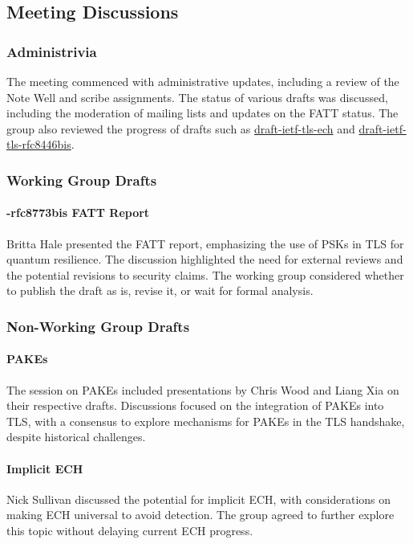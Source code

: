 \documentclass{article}
\begin{document}
\subsection{Meeting Discussions}

\subsubsection{Administrivia}
The meeting commenced with administrative updates, including a review of the Note Well and scribe assignments. The status of various drafts was discussed, including the moderation of mailing lists and updates on the FATT status. The group also reviewed the progress of drafts such as \href{https://datatracker.ietf.org/doc/html/draft-ietf-tls-ech}{draft-ietf-tls-ech} and \href{https://datatracker.ietf.org/doc/html/draft-ietf-tls-rfc8446bis}{draft-ietf-tls-rfc8446bis}.

\subsubsection{Working Group Drafts}
\paragraph{-rfc8773bis FATT Report}
Britta Hale presented the FATT report, emphasizing the use of PSKs in TLS for quantum resilience. The discussion highlighted the need for external reviews and the potential revisions to security claims. The working group considered whether to publish the draft as is, revise it, or wait for formal analysis.

\subsubsection{Non-Working Group Drafts}
\paragraph{PAKEs}
The session on PAKEs included presentations by Chris Wood and Liang Xia on their respective drafts. Discussions focused on the integration of PAKEs into TLS, with a consensus to explore mechanisms for PAKEs in the TLS handshake, despite historical challenges.

\paragraph{Implicit ECH}
Nick Sullivan discussed the potential for implicit ECH, with considerations on making ECH universal to avoid detection. The group agreed to further explore this topic without delaying current ECH progress.
\end{document}
